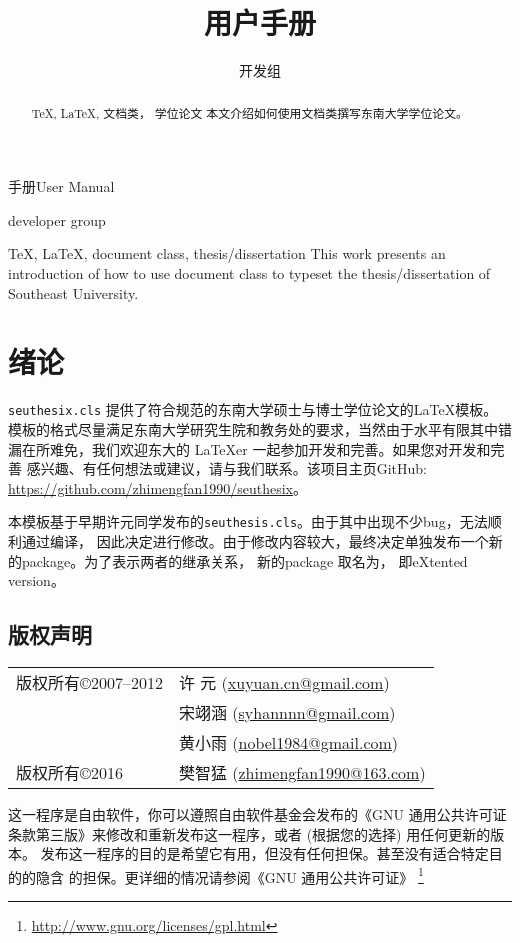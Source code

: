 \documentclass[figurelist,tablelist,algorithmlist,nomlist,masters]{seuthesix}
\begin{document}
\title{\seuthesix 用户手册}{手册}{\seuthesix User Manual}{\seuthesix}
\author{\seuthesix 开发组}{\seuthesix developer group}
\major{\TeX}
\submajor{\LaTeX}
\authorizedate{\today}
\makebigcover
\makecover
\begin{abstract}{\TeX, \LaTeX, 文档类， 学位论文}
本文介绍如何使用\seuthesix 文档类撰写东南大学学位论文。
\end{abstract}
\begin{englishabstract}{\TeX, \LaTeX, document class, thesis/dissertation}
This work presents an introduction of how to use \seuthesix document class to 
typeset the thesis/dissertation of Southeast University.
\end{englishabstract}

\tableofcontents
\listofothers

\mainmatter
\chapter{绪论}
\verb+seuthesix.cls+ 提供了符合规范的东南大学硕士与博士学位论文的\LaTeX 模板。
模板的格式尽量满足东南大学研究生院和教务处的要求，当然由于水平有限其中错
漏在所难免，我们欢迎东大的 \LaTeX{er} 一起参加开发和完善。如果您对开发和完善\seuthesix
感兴趣、有任何想法或建议，请与我们联系。该项目主页GitHub:
\url{https://github.com/zhimengfan1990/seuthesix}。

本模板基于早期许元同学发布的\verb+seuthesis.cls+。由于其中出现不少bug，无法顺利通过编译，
因此决定进行修改。由于修改内容较大，最终决定单独发布一个新的package。为了表示两者的继承关系，
新的package 取名为\seuthesix， 即\seuthesis{ }eXtented version。

\section{版权声明}
\begin{tabular}{ll}
版权所有\copyright 2007--2012 & 许 元 (\url{xuyuan.cn@gmail.com})\\
&宋翊涵 (\url{syhannnn@gmail.com})\\
& 黄小雨 (\url{nobel1984@gmail.com})\\
版权所有\copyright 2016 & 樊智猛 (\url{zhimengfan1990@163.com})
\end{tabular}
\par
这一程序是自由软件，你可以遵照自由软件基金会发布的《GNU 通用公共许可证
条款第三版》来修改和重新发布这一程序，或者 (根据您的选择) 用任何更新的版本。
发布这一程序的目的是希望它有用，但没有任何担保。甚至没有适合特定目的的隐含
的担保。更详细的情况请参阅《GNU 通用公共许可证》
\footnote{\url{http://www.gnu.org/licenses/gpl.html}}
\end{document}
